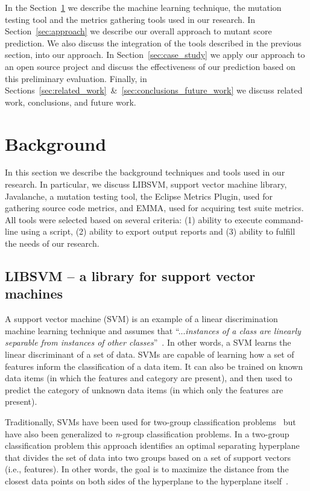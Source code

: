\documentclass[conference]{IEEEtran}
\begin{document}
In the Section~\ref{sec:background} we describe the machine learning technique, the mutation testing tool and the metrics gathering tools used in our research. In Section~\ref{sec:approach} we describe our overall approach to mutant score prediction. We also discuss the integration of the tools described in the previous section, into our approach. In Section~\ref{sec:case_study} we apply our approach to an open source project and discuss the effectiveness of our prediction based on this preliminary evaluation. Finally, in Sections~\ref{sec:related_work}~\&~\ref{sec:conclusions_future_work} we discuss related work, conclusions, and future work.


\section{Background}
\label{sec:background}
In this section we describe the background techniques and tools used in our research. In particular, we discuss LIBSVM, support vector machine library, Javalanche, a mutation testing tool, the Eclipse Metrics Plugin, used for gathering source code metrics, and EMMA, used for acquiring test suite metrics. All tools were selected based on several criteria: (1) ability to execute command-line using a script, (2) ability to export output reports and (3) ability to fulfill the needs of our research.


\subsection{LIBSVM -- a library for support vector machines}
\label{subsec:libsvm}
A support vector machine (SVM) is an example of a linear discrimination machine learning technique and assumes that ``...\emph{instances of a class are linearly separable from instances of other classes}''~\cite{ALP04}. In other words, a SVM learns the linear discriminant of a set of data. SVMs are capable of learning how a set of features inform the classification of a data item. It can also be trained on known data items (in which the features and category are present), and then used to predict the category of  unknown data items (in which only the features are present).

Traditionally, SVMs have been used for two-group classification problems~\cite{CV95} but have also been generalized to \emph{n}-group classification problems. In a two-group classification problem this approach identifies an optimal separating hyperplane that divides the set of data into two groups based on a set of support vectors (i.e., features). In other words, the goal is to maximize the distance from the closest data points on both sides of the hyperplane to the hyperplane itself~\cite{ALP04}.
\end{document}
